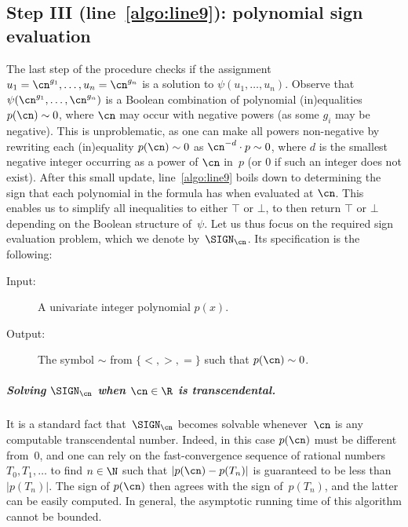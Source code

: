 \subsection{Step III (line~\ref{algo:line9}): polynomial sign
evaluation}\label{subsection:polynomial-sign-evaluation} 
The last step of the procedure checks if the assignment $u_1 =
\cn^{g_1},\dots,u_n = \cn^{g_n}$ is a solution to $\psi(u_1,\dots,u_n)$. Observe
that $\psi(\cn^{g_1},\dots,\cn^{g_n})$ is a Boolean combination of polynomial
(in)equalities $p(\cn) \sim 0$, where $\cn$ may occur with negative powers (as
some $g_i$ may be negative). This is unproblematic, as one can make all powers
non-negative by rewriting each (in)equality $p(\cn) \sim 0$ as $\cn^{-d} \cdot p
\sim 0$, where $d$ is the smallest negative integer occurring as a power of
$\cn$ in~$p$ (or $0$ if such an integer does not exist).
After this small update, line~\ref{algo:line9} boils down to determining the
sign that each polynomial in the formula has when evaluated at $\cn$. This
enables us to simplify all inequalities to either $\top$ or $\bot$, to then
return $\top$ or $\bot$ depending on the Boolean structure of~$\psi$. Let us
thus focus on the required sign evaluation problem, which we denote
by~$\SIGN_{\cn}$. Its specification is the following:

\begin{center}
  \begin{minipage}{0.95\linewidth}
    \begin{description}
      \item[Input:]\tab A univariate integer polynomial $p(x)$.
      \item[Output:]\tab The symbol $\sim$ from $\{<,>,=\}$
      such that $p(\cn) \sim 0$.
    \end{description}
  \end{minipage}
\end{center}

\subparagraph*{Solving {\rm$\SIGN_{\cn}$} when $\cn \in \R$ is transcendental.}
It is a standard fact that~$\SIGN_{\cn}$ becomes solvable whenever~$\cn$ is any
computable transcendental number. Indeed, in this case $p(\cn)$ must be
different from~$0$, and one can rely on the fast-convergence sequence of
rational numbers~$T_0,T_1,\dots$ to find $n \in \N$ such that $|p(\cn) -
p(T_{n})|$ is guaranteed to be less than $|p(T_{n})|$. The sign of $p(\cn)$ then
agrees with the sign of~$p(T_{n})$, and the latter can be easily computed. In
general, the asymptotic running time of this algorithm cannot be bounded. 



